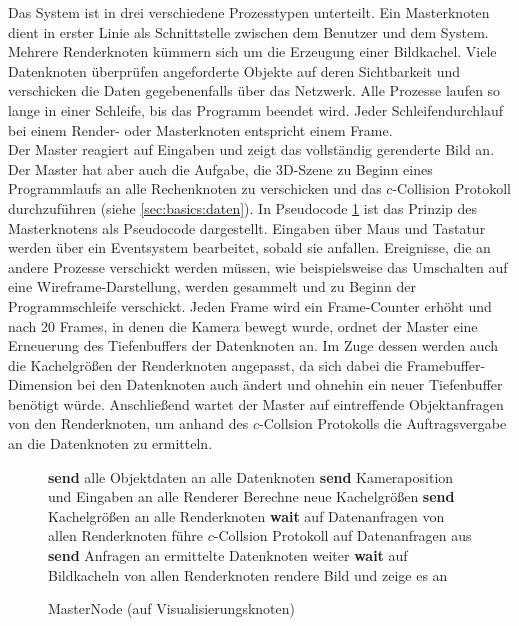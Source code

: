Das System ist in drei verschiedene Prozesstypen unterteilt. Ein Masterknoten dient in erster Linie als Schnittstelle zwischen dem Benutzer und dem System. Mehrere Renderknoten kümmern sich um die Erzeugung einer Bildkachel. Viele Datenknoten überprüfen angeforderte Objekte auf deren Sichtbarkeit und verschicken die Daten gegebenenfalls über das Netzwerk. Alle Prozesse laufen so lange in einer Schleife, bis das Programm beendet wird. Jeder Schleifendurchlauf bei einem Render- oder Masterknoten entspricht einem Frame.\\
Der Master reagiert auf Eingaben und zeigt das vollständig gerenderte Bild an. Der Master hat aber auch die Aufgabe, die 3D-Szene zu Beginn eines Programmlaufs an alle Rechenknoten zu verschicken und das $c$-Collision Protokoll durchzuführen (siehe \ref{sec:basics:daten}). In Pseudocode \ref{alg:impl:masternode} ist das Prinzip des Masterknotens als Pseudocode dargestellt. Eingaben über Maus und Tastatur werden über ein Eventsystem bearbeitet, sobald sie anfallen. Ereignisse, die an andere Prozesse verschickt werden müssen, wie beispielsweise das Umschalten auf eine Wireframe-Darstellung, werden gesammelt und zu Beginn der Programmschleife verschickt. Jeden Frame wird ein Frame-Counter erhöht und nach 20 Frames, in denen die Kamera bewegt wurde, ordnet der Master eine Erneuerung des Tiefenbuffers der Datenknoten an. Im Zuge dessen werden auch die Kachelgrößen der Renderknoten angepasst, da sich dabei die Framebuffer-Dimension bei den Datenknoten auch ändert und ohnehin ein neuer Tiefenbuffer benötigt würde. Anschließend wartet der Master auf eintreffende Objektanfragen von den Renderknoten, um anhand des $c$-Collsion Protokolls die Auftragsvergabe an die Datenknoten zu ermitteln.
\begin{figure}[ttt!]
\centering
 \begin{minipage}[t]{12cm}
\begin{algorithm}[H]
  \caption{MasterNode (auf Visualisierungsknoten)\label{alg:impl:masternode}} 
    \begin{algorithmic} [1]
      \STATE \textbf{send} alle Objektdaten an alle Datenknoten
      \LOOP
	\STATE \textbf{send} Kameraposition und Eingaben an alle Renderer
	  \STATE Berechne neue Kachelgrößen
	  \STATE \textbf{send} Kachelgrößen an alle Renderknoten
	\ENDIF
	\STATE \textbf{wait} auf Datenanfragen von allen Renderknoten
	\STATE führe $c$-Collsion Protokoll auf Datenanfragen aus
	\STATE \textbf{send} Anfragen an ermittelte Datenknoten weiter
	\STATE \textbf{wait} auf Bildkacheln von allen Renderknoten
	\STATE rendere Bild und zeige es an
      \ENDLOOP
    \end{algorithmic}
\end{algorithm}
 \end{minipage}
\end{figure}

